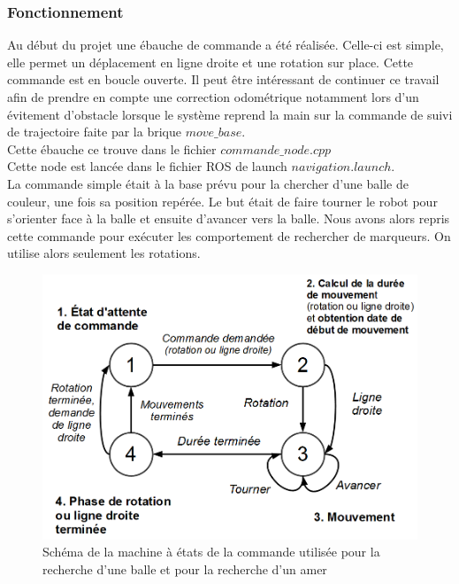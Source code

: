 \documentclass[10pt,a4paper]{article}
\begin{document}
\subsubsection{Fonctionnement}

Au début du projet une ébauche de commande a été réalisée. Celle-ci est simple, elle permet un déplacement en ligne droite et une rotation sur place. Cette commande est en boucle ouverte. Il peut \^etre intéressant de continuer ce travail afin de prendre en compte une correction odométrique notamment lors d'un évitement d'obstacle lorsque le système reprend la main sur la commande de suivi de trajectoire faite par la brique $move\_base$.\\
Cette ébauche ce trouve dans le fichier $commande\_node.cpp$ \\
Cette node est lancée dans le fichier ROS de launch $navigation.launch$.\\

La commande simple était à la base prévu pour la chercher d'une balle de couleur, une fois sa position repérée. Le but était de faire tourner le robot pour s'orienter face à la balle et ensuite d'avancer vers la balle. Nous avons alors repris cette commande pour exécuter les comportement de rechercher de marqueurs. On utilise alors seulement les rotations.

\begin{figure}[!h]
\centering\includegraphics[scale=0.4]{figures/commande_MEF.png}
\caption{Schéma de la machine à états de la commande utilisée pour la recherche d'une balle et pour la recherche d'un amer}
\label{commande_MEF}
\end{figure}
\end{document}
